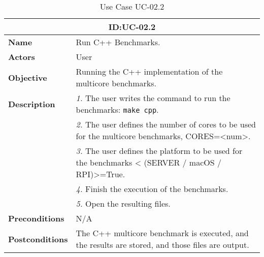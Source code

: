 \begin{table}[H]
    \centering
    \begin{tabular}{l p{10cm}}
        \toprule
        \multicolumn{2}{c}{\textbf{ID:\@ UC-02.2}} \\
        \toprule
        \textbf{Name}                         &  Run C++ Benchmarks. \\
        \textbf{Actors}                       &  User \\
        \textbf{Objective}                    &  Running the C++ implementation of the multicore benchmarks. \\
        \multirow{1}{*}{\textbf{Description}} & \textsl{1.} The user writes the command to run the benchmarks: \texttt{make cpp}.\\
                                              & \textsl{2.} The user defines the number of cores to be used for the multicore benchmarks, CORES=<num>.\\
                                              & \textsl{3.} The user defines the platform to be used for the benchmarks < (SERVER / macOS / RPI)>=True.\\
                                              & \textsl{4.} Finish the execution of the benchmarks.\\
                                              & \textsl{5.} Open the resulting files.\\
        \textbf{Preconditions}                &  N/A \\
        \textbf{Postconditions}               &  The C++ multicore benchmark is executed, and the results are stored, and those files are output. \\
    \end{tabular}
    \caption{Use Case UC-02.2}\label{tab:uc-02.2}
\end{table}



